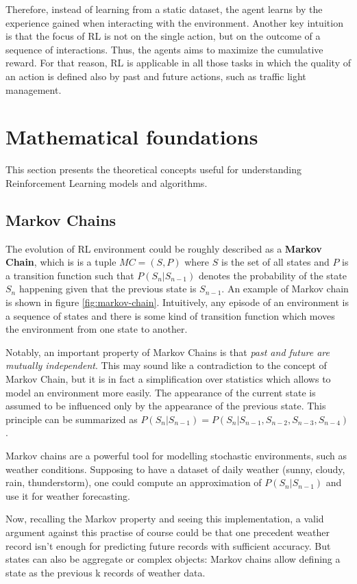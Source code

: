 Therefore, instead of learning from a static dataset, the agent learns by the experience gained when interacting with the environment.
Another key intuition is that the focus of RL is not on the single action, but on the outcome of a sequence of interactions. Thus, the agents aims to maximize the cumulative reward.
For that reason, RL is applicable in all those tasks in which the quality of an action is defined also by past and future actions, such as traffic light management.

\section{Mathematical foundations}

This section presents the theoretical concepts useful for understanding Reinforcement Learning models and algorithms.

\subsection{Markov Chains}

The evolution of RL environment could be roughly described as a \textbf{Markov Chain}, which is is a tuple $MC = (S, P)$ where $S$ is the set of all states and $P$ is a transition function such that $P(S_n | S_{n-1})$ denotes the probability of the state $S_n$ happening given that the previous state is $S_{n-1}$. An example of Markov chain is shown in figure \ref{fig:markov-chain}. Intuitively, any episode of an environment is a sequence of states and there is some kind of transition function which moves the environment from one state to another.

Notably, an important property of Markov Chains is that \textit{past and future are mutually independent}. This may sound like a contradiction to the concept of Markov Chain, but it is in fact a simplification over statistics which allows to model an environment more easily. The appearance of the current state is assumed to be influenced only by the appearance of the previous state. This principle can be summarized as $P(S_n | S_{n-1}) = P(S_n | S_{n-1}, S_{n-2}, S_{n-3}, S_{n-4})$.

Markov chains are a powerful tool for modelling stochastic environments, such as weather conditions. Supposing to have a dataset of daily weather (sunny, cloudy, rain, thunderstorm), one could compute an approximation of $P(S_n | S_{n-1})$ and use it for weather forecasting.

Now, recalling the Markov property and seeing this implementation, a valid argument against this practise of course could be that one precedent weather record isn't enough for predicting future records with sufficient accuracy. But states can also be aggregate or complex objects: Markov chains allow defining a state as the previous k records of weather data.

